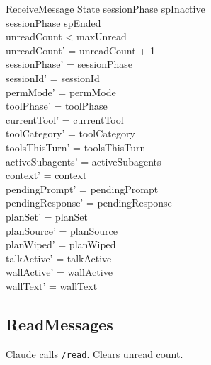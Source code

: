 \documentclass[a4paper,10pt,fleqn]{article}
\begin{document}
\begin{schema}{ReceiveMessage}
  \Delta State
  \where
  sessionPhase \neq spInactive \\
  sessionPhase \neq spEnded \\
  unreadCount < maxUnread \\
  unreadCount' = unreadCount + 1 \\
  sessionPhase' = sessionPhase \\
  sessionId' = sessionId \\
  permMode' = permMode \\
  toolPhase' = toolPhase \\
  currentTool' = currentTool \\
  toolCategory' = toolCategory \\
  toolsThisTurn' = toolsThisTurn \\
  activeSubagents' = activeSubagents \\
  context' = context \\
  pendingPrompt' = pendingPrompt \\
  pendingResponse' = pendingResponse \\
  planSet' = planSet \\
  planSource' = planSource \\
  planWiped' = planWiped \\
  talkActive' = talkActive \\
  wallActive' = wallActive \\
  wallText' = wallText
\end{schema}

\subsection{ReadMessages}

Claude calls \texttt{/read}. Clears unread count.
\end{document}
